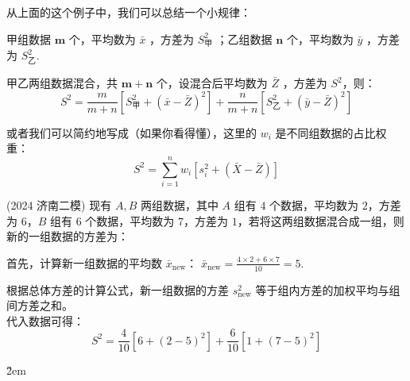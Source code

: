 \begin{theorem}
    从上面的这个例子中，我们可以总结一个小规律：

    甲组数据 $\mathbf{m}$ 个，平均数为 $\bar{x}$ ，方差为 $S_{\text{甲}}^2$ ；乙组数据 $\mathbf{n}$ 个，平均数为 $\bar{y}$ ，方差为 $S_{\text{乙}}^2$.

    甲乙两组数据混合，共 $\mathbf{m}+\mathbf{n}$ 个，设混合后平均数为 $\bar{Z}$ ，方差为 $S^2$，则：
    $$ S^2=\frac{m}{m+n}\left[S_{\text{甲}}^2+(\bar{x}-\bar{Z})^2\right]+\frac{n}{m+n}\left[S_{\text{乙}}^2+(\bar{y}-\bar{Z})^2\right] $$

    或者我们可以简约地写成（如果你看得懂），这里的 $w_i$ 是不同组数据的占比权重：
    $$ S^2 = \sum_{i=1}^n w_i\left[s_i^2+(\bar{X}-\bar{Z})\right] $$
\end{theorem}

\begin{example}
    (2024 济南二模) 现有 $A,B$ 两组数据，其中 $A$ 组有 $4$ 个数据，平均数为 $2$，方差为 $6$，$B$ 组有 $6$ 个数据，平均数为 $7$，方差为 $1$，若将这两组数据混合成一组，则新的一组数据的方差为：
\end{example}

\begin{solution}
    首先，计算新一组数据的平均数 $\bar{x}_{\text{new}}$：
    $\bar{x}_{\text{new}} = \frac{4 \times 2 + 6 \times 7}{10} = 5.$

    根据总体方差的计算公式，新一组数据的方差 $s_{\text{new}}^2$ 等于组内方差的加权平均与组间方差之和。\\
    代入数据可得：
    $$
        S^2 = \frac{4}{10}\left[6 + (2 - 5)^2\right] + \frac{6}{10}\left[1 + (7 - 5)^2\right]
    $$
\end{solution}

\v{2em}

